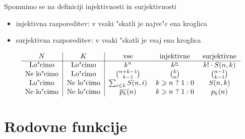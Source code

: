 \documentclass[a4paper,12pt]{article}
\theoremstyle{definition}
\theoremstyle{remark}
\newtheorem*{ex}{Primer}
\begin{document}
Spomnimo se na definiciji injektivnosti in surjektivnosti
\begin{itemize}
    \item injektivna razporeditev: v vsaki "skatli je najve"c ena kroglica
    \item surjektivna razporeditev: v vsaki "skatli je vsaj ena kroglica
\end{itemize}
\[\begin{tabular}{c|c|c c c}
    $N$ & $K$ & vse & injektivne & surjektivne \\
\hline
    Lo"cimo & Lo"cimo & $k^n$ & $k^{\underline{n}}$ & $k!\cdot S(n, k)$\\
    Ne lo"cimo & Lo"cimo & $\binom{n + k - 1}{k - 1}$ & $\binom{k}{n}$ & $\binom{n - 1}{k - 1}$\\
    Lo"cimo & Ne lo"cimo & $\sum_{i \leqslant k} S(n, i)$ & $k \geqslant n \ ? \ 1 : 0$ & $S(n, k)$\\
    Ne lo"cimo & Ne lo"cimo & $\overline{p_k}(n)$ & $k \geqslant n \ ? \ 1:0$ & $p_k(n)$ \\
\end{tabular}\]



%

\section{Rodovne funkcije}
\end{document}
